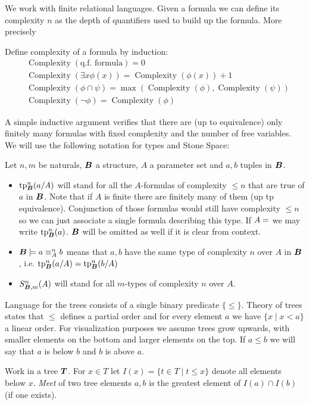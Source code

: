 \documentclass{amsart}
\DeclareMathOperator{\TT}{\boldface T}
\DeclareMathOperator{\B}{\boldface B}
\DeclareMathOperator{\cx}{Complexity}
\begin{document}
We work with finite relational languages. Given a formula we can define its complexity $n$ as the depth of quantifiers used to build up the formula. More precisely
\begin{Definition}
Define complexity of a formula by induction:
\begin{align*}
	&\cx(\text{q.f. formula}) = 0 \\
	&\cx(\exists x \phi(x)) = \cx(\phi(x)) + 1 \\
	&\cx(\phi \cap \psi) = \max(\cx(\phi), \cx(\psi)) \\
	&\cx(\neg \phi) = \cx(\phi)
\end{align*}
\end{Definition}
A simple inductive argument verifies that there are (up to equivalence) only finitely many formulas with fixed complexity and the number of free variables. We will use the following notation for types and Stone Space:
\begin{Definition} Let $n,m$ be naturals, $\B$ a structure, $A$ a parameter set and $a,b$ tuples in $\B$.
	\begin{itemize}
		\item $\tp^n_{\B}(a/A)$ will stand for all the $A$-formulas of complexity $\leq n$ that are true of $a$ in $\B$. Note that if $A$ is finite there are finitely many of them (up tp equivalence). Conjunction of those formulas would still have complexity $\leq n$ so we can just associate a single formula describing this type. If $A = \empty$ we may write $\tp^n_{\B}(a)$. $\B$ will be omitted as well if it is clear from context.
		\item $\B \models a \equiv^n_A b$ means that $a,b$ have the same type of complexity $n$ over $A$ in $\B$, i.e. $\tp^n_{\B}(a/A) = \tp^n_{\B}(b/A)$
		\item $S^n_{\B, m}(A)$ will stand for all $m$-types of complexity $n$ over $A$.
	\end{itemize}
\end{Definition}

Language for the trees consists of a single binary predicate $\{\leq\}$. Theory of trees states that $\leq$ defines a partial order and for every element $a$ we have $\{x \mid x < a\}$ a linear order. For visualization purposes we assume trees grow upwards, with smaller elements on the bottom and larger elements on the top. If $a \leq b$ we will say that $a$ is below $b$ and $b$ is above $a$.

\begin{Definition}
	Work in a tree $\TT$. For $x \in T$ let $I(x) = \{t \in T \mid t \leq x\}$ denote all elements below $x$. \emph{Meet} of two tree elements $a,b$ is the greatest element of $I(a) \cap I(b)$ (if one exists).
\end{Definition}
\end{document}
